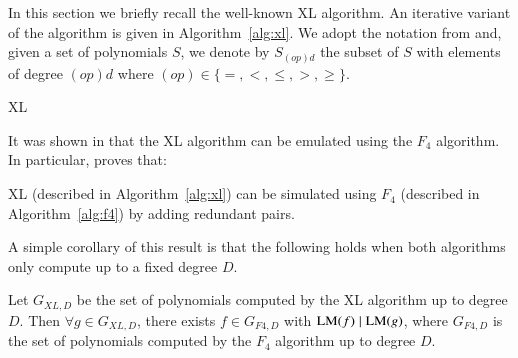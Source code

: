 In this section we briefly recall the well-known XL algorithm.
An iterative variant of the algorithm is given in Algorithm~\ref{alg:xl}. We adopt the notation from \cite{mxl3} and,
given a set of polynomials $S$, we denote by $S_{(op)d}$ the subset of $S$ with elements of degree $(op)d$ where $(op) \in \{=,<,\leq,>,\geq\}$.

\begin{algorithm}
\caption{XL \label{alg:xl}}
\end{algorithm}

It was shown in \cite{DBLP:conf/asiacrypt/ArsFIKS04} that the XL algorithm can be emulated using the $F_4$ algorithm.
In particular, \cite{DBLP:conf/asiacrypt/ArsFIKS04} proves that:
\begin{lemma}
\label{lem:xl}
XL (described in Algorithm~\ref{alg:xl}) can be simulated using  $F_4$  (described in Algorithm~\ref{alg:f4}) by adding redundant pairs.
\end{lemma}

\noindent
A simple corollary of this result is that the following holds when both algorithms only compute up to a fixed degree $D$.
\begin{corollary}
\label{corollary:iteration}
Let $G_{XL,D}$ be the set of polynomials computed by the XL algorithm up to degree $D$.
Then  $\forall g \in G_{XL,D}$, there exists $f \in G_{F4,D}$ with $\textsc{LM}(f) \mid \textsc{LM}(g)$,  where $G_{F4,D}$ is the set of polynomials computed by the $F_4$ algorithm up to degree $D$.
\end{corollary}

